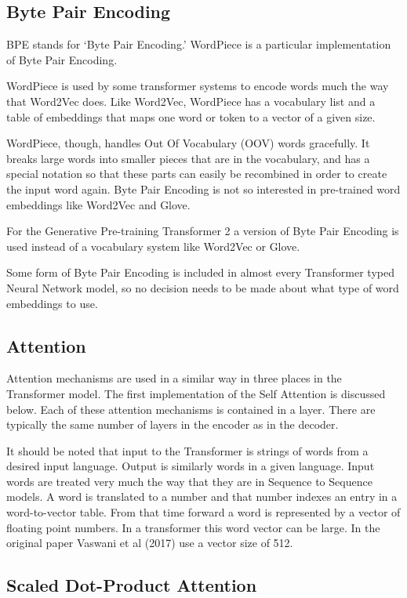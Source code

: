 \subsection*{Byte Pair Encoding}

\ac{BPE} stands for `Byte Pair Encoding.' WordPiece is a particular implementation of Byte Pair Encoding.

WordPiece is used by some transformer systems to encode words much the way that Word2Vec does. Like Word2Vec, WordPiece  has a vocabulary list and a table of embeddings that maps one word or token to a vector of a given size.

WordPiece, though, handles Out Of Vocabulary (OOV) words gracefully. It breaks large words into smaller pieces that are in the vocabulary, and has a special notation so that these parts can easily be recombined in order to create the input word again. Byte Pair Encoding is not so interested in pre-trained word embeddings like Word2Vec and Glove.

For the Generative Pre-training Transformer 2 a version of Byte Pair Encoding is used instead of a vocabulary system like Word2Vec or Glove.

Some form of Byte Pair Encoding is included in almost every Transformer typed Neural Network model, so no decision needs to be made about what type of word embeddings to use.

\subsection*{Attention}
Attention mechanisms are used in a similar way in three places in the Transformer model. The first implementation of the Self Attention is discussed below. Each of these attention mechanisms is contained in a layer. There are typically the same number of layers in the encoder as in the decoder.

It should be noted that input to the Transformer is strings of words from a desired input language. Output is similarly words in a given language. Input words are treated very much the way that they are in Sequence to Sequence models. A word is translated to a number and that number indexes an entry in a word-to-vector table. From that time forward a word is represented by a vector of floating point numbers. In a transformer this word vector can be large. In the original paper Vaswani et al (2017)\cite{Vaswani2017AttentionIA} use a vector size of 512. 

\subsection*{Scaled Dot-Product Attention}

